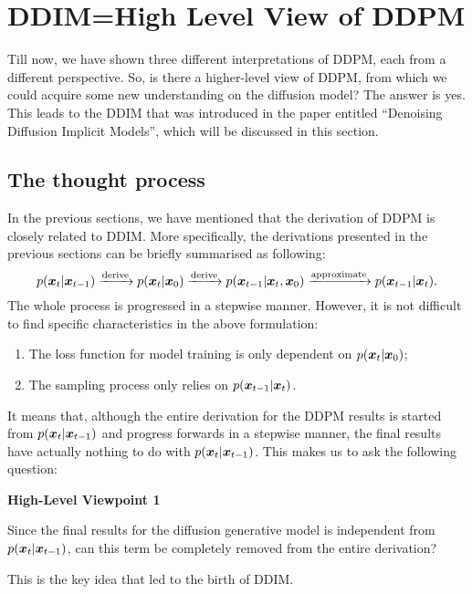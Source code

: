 \section{DDIM=High Level View of DDPM}\label{sect_4:DDIM}


Till now, we have shown three different interpretations of DDPM, each from a different perspective. So, is there a higher-level view of DDPM, from which we could acquire some new understanding on the diffusion model? The answer is yes. This leads to the DDIM that was introduced in the paper entitled ``Denoising Diffusion Implicit Models''\cite{song2020denoising}, which will be discussed in this section.

\subsection{The thought process}
In the previous sections, we have mentioned that the derivation of DDPM is closely related to DDIM. More specifically, the derivations presented in the previous sections can be briefly summarised as following:
\begin{equation}
    \label{eq:4.1}
    p(\bm{x}_{t}|\bm{x}_{t-1})\xrightarrow{\text{derive}} p(\bm{x}_{t}|\bm{x}_0) \xrightarrow{\text{derive}} p(\bm{x}_{t-1}|\bm{x}_{t},\bm{x}_0)\xrightarrow{\text{approximate}}p(\bm{x}_{t-1}|\bm{x}_{t}).
\end{equation}
The whole process is progressed in a stepwise manner. However, it is not difficult to find specific characteristics in the above formulation:
\begin{myquote}
\begin{enumerate}
    \item The loss function for model training is only dependent on $p(\bm{x}_{t}|\bm{x}_0)$;
    \item The sampling process only relies on $p(\bm{x}_{t-1}|\bm{x}_{t})$.
\end{enumerate}
\end{myquote}
It means that, although the entire derivation for the DDPM results is started from $p(\bm{x}_{t}|\bm{x}_{t-1})$ and progress forwards in a stepwise manner, the final results have actually nothing to do with $p(\bm{x}_{t}|\bm{x}_{t-1})$. This makes us to ask the following question:
\begin{myquote}
    \textbf{High-Level Viewpoint 1}

    Since the final results for the diffusion generative model is independent from $p(\bm{x}_{t}|\bm{x}_{t-1})$, can this term be completely removed from the entire derivation?
\end{myquote}
This is the key idea that led to the birth of DDIM.

